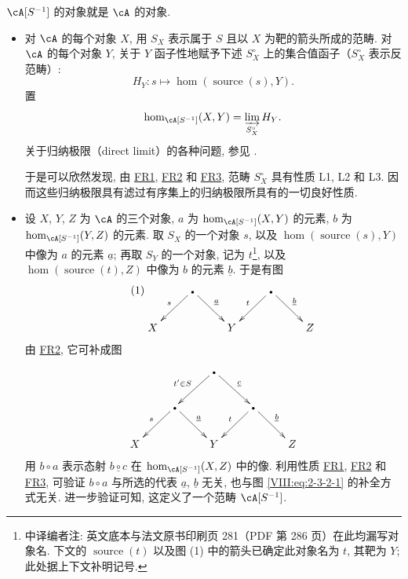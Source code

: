 $\cA[S^{-1}]$ 的对象就是 $\cA$ 的对象.
\begin{itemize}
  \item 对 $\cA$ 的每个对象 $X$, 用 $S_X$ 表示属于 $S$ 且以 $X$ 为靶的箭头所成的范畴. 对 $\cA$ 的每个对象 $Y$, 关于 $Y$ 函子性地赋予下述 $S_X^\circ$ 上的集合值函子（$S_X^\circ$ 表示反范畴）:
    \[
      H_Y:s\mapsto \hom(\operatorname{source}(s),Y) \text{.}
    \]
    置
    \[
      \hom_{\cA[S^{-1}]}(X,Y) = \varinjlim_{S_X^\circ} H_Y \text{.}
    \]
    关于归纳极限（direct limit）的各种问题, 参见 \cite{ar62}.

    于是可以欣然发现, 由 \hyperlink{VIII:FR1}{FR1}, \hyperlink{VIII:FR2}{FR2} 和 \hyperlink{VIII:FR3}{FR3}, 范畴 $S_X^\circ$ 具有性质 L1, L2 和 L3. 因而这些归纳极限具有滤过有序集上的归纳极限所具有的一切良好性质.
  \item 设 $X$, $Y$, $Z$ 为 $\cA$ 的三个对象, $a$ 为 $\hom_{\cA[S^{-1}]}(X,Y)$ 的元素, $b$ 为 $\hom_{\cA[S^{-1}]}(Y,Z)$ 的元素. 取 $S_X$ 的一个对象 $s$, 以及 $\hom(\operatorname{source}(s),Y)$ 中像为 $a$ 的元素 $\underline a$; 再取 $S_Y$ 的一个对象, 记为 $t$\footnote{中译编者注: 英文底本与法文原书印刷页 281（PDF 第 286 页）在此均漏写对象名. 下文的 $\operatorname{source}(t)$ 以及图 (1) 中的箭头已确定此对象名为 $t$, 其靶为 $Y$; 此处据上下文补明记号.}, 以及 $\hom(\operatorname{source}(t),Z)$ 中像为 $b$ 的元素 $\underline b$. 于是有图
    \begin{equation*}\tag{1}\label{VIII:eq:2-3-2-1}
    \xymatrix{
      & \bullet \ar[dl]_-s \ar[dr]^-{\underline a}
        &
        & \bullet \ar[dl]_-t \ar[dr]^-{\underline b} \\
      X
        &
        & Y
        &
        & Z
    }
    \end{equation*}
    由 \hyperlink{VIII:FR2}{FR2}, 它可补成图
    \[\xymatrix{
      & & \bullet \ar[dl]_-{t'\in S} \ar[dr]^-{\underline c} \\
      & \bullet \ar[dl]_-s \ar[dr]^-{\underline a}
        & & \bullet \ar[dl]_-t \ar[dr]^-{\underline b} \\
      X
        & & Y
        & & Z
    }\]
    用 $b\circ a$ 表示态射 $\underline{b\circ c}$ 在 $\hom_{\cA[S^{-1}]}(X,Z)$ 中的像. 利用性质 \hyperlink{VIII:FR1}{FR1}, \hyperlink{VIII:FR2}{FR2} 和 \hyperlink{VIII:FR3}{FR3}, 可验证 $b\circ a$ 与所选的代表 $\underline a$, $\underline b$ 无关, 也与图 \eqref{VIII:eq:2-3-2-1} 的补全方式无关. 进一步验证可知, 这定义了一个范畴 $\cA[S^{-1}]$.
\end{itemize}

